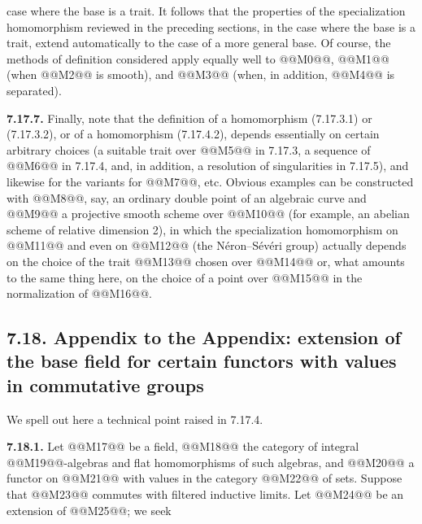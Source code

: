 case where the base is a trait. It follows that the properties of the specialization homomorphism reviewed in the preceding sections, in the case where the base is a trait, extend automatically to the case of a more general base. Of course, the methods of definition considered apply equally well to @@M0@@, @@M1@@ (when @@M2@@ is smooth), and @@M3@@ (when, in addition, @@M4@@ is separated).

\textbf{7.17.7.} Finally, note that the definition of a homomorphism (7.17.3.1) or (7.17.3.2), or of a homomorphism (7.17.4.2), depends essentially on certain arbitrary choices (a suitable trait over @@M5@@ in 7.17.3, a sequence of @@M6@@ in 7.17.4, and, in addition, a resolution of singularities in 7.17.5), and likewise for the variants for @@M7@@, etc. Obvious examples can be constructed with @@M8@@, say, an ordinary double point of an algebraic curve and @@M9@@ a projective smooth scheme over @@M10@@ (for example, an abelian scheme of relative dimension 2), in which the specialization homomorphism on @@M11@@ and even on @@M12@@ (the Néron--Sévéri group) actually depends on the choice of the trait @@M13@@ chosen over @@M14@@ or, what amounts to the same thing here, on the choice of a point over @@M15@@ in the normalization of @@M16@@.

\subsection*{7.18. Appendix to the Appendix: extension of the base field for certain functors with values in commutative groups}
We spell out here a technical point raised in 7.17.4.

\textbf{7.18.1.} Let @@M17@@ be a field, @@M18@@ the category of integral @@M19@@-algebras and flat homomorphisms of such algebras, and @@M20@@ a functor on @@M21@@ with values in the category @@M22@@ of sets. Suppose that @@M23@@ commutes with filtered inductive limits. Let @@M24@@ be an extension of @@M25@@; we seek
